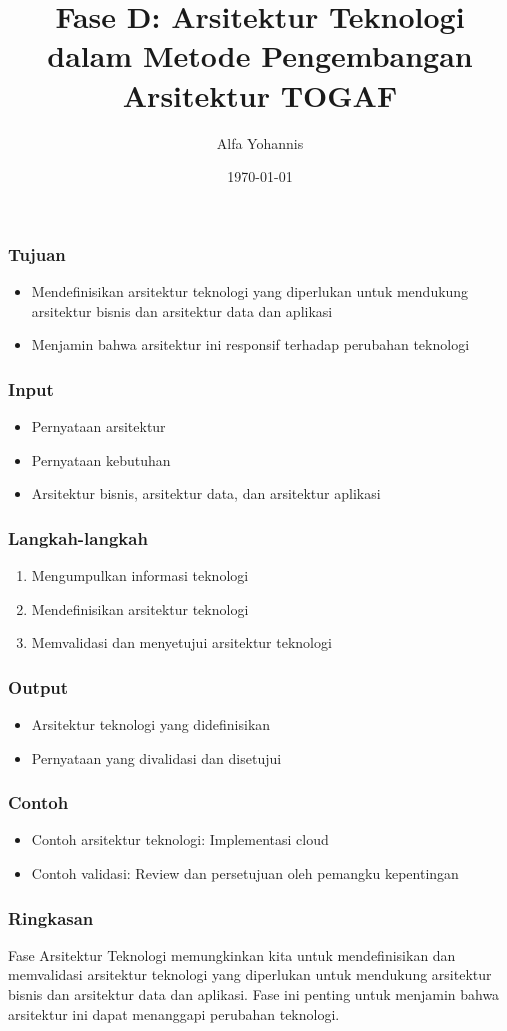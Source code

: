 \documentclass{beamer}
\title{Fase D: Arsitektur Teknologi dalam Metode Pengembangan Arsitektur TOGAF}
\author{Alfa Yohannis}
\date{\today}
\begin{document}
\frame{\titlepage}

\begin{frame}
\frametitle{Tujuan}
\begin{itemize}
\item Mendefinisikan arsitektur teknologi yang diperlukan untuk mendukung arsitektur bisnis dan arsitektur data dan aplikasi
\item Menjamin bahwa arsitektur ini responsif terhadap perubahan teknologi
\end{itemize}
\end{frame}

\begin{frame}
\frametitle{Input}
\begin{itemize}
\item Pernyataan arsitektur
\item Pernyataan kebutuhan
\item Arsitektur bisnis, arsitektur data, dan arsitektur aplikasi
\end{itemize}
\end{frame}

\begin{frame}
\frametitle{Langkah-langkah}
\begin{enumerate}
\item Mengumpulkan informasi teknologi
\item Mendefinisikan arsitektur teknologi
\item Memvalidasi dan menyetujui arsitektur teknologi
\end{enumerate}
\end{frame}

\begin{frame}
\frametitle{Output}
\begin{itemize}
\item Arsitektur teknologi yang didefinisikan
\item Pernyataan yang divalidasi dan disetujui
\end{itemize}
\end{frame}

\begin{frame}
\frametitle{Contoh}
\begin{itemize}
\item Contoh arsitektur teknologi: Implementasi cloud
\item Contoh validasi: Review dan persetujuan oleh pemangku kepentingan
\end{itemize}
\end{frame}

\begin{frame}
\frametitle{Ringkasan}
Fase Arsitektur Teknologi memungkinkan kita untuk mendefinisikan dan memvalidasi arsitektur teknologi yang diperlukan untuk mendukung arsitektur bisnis dan arsitektur data dan aplikasi. Fase ini penting untuk menjamin bahwa arsitektur ini dapat menanggapi perubahan teknologi.
\end{frame}
\end{document}
